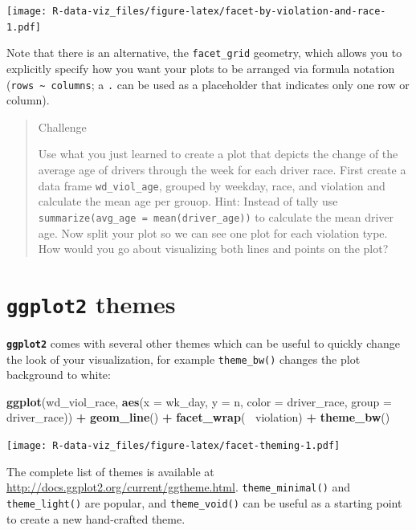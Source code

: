 \documentclass[]{book}
\newenvironment{Shaded}{\begin{snugshade}}{\end{snugshade}}
\newcommand{\KeywordTok}[1]{\textcolor[rgb]{0.13,0.29,0.53}{\textbf{#1}}}
\newcommand{\DataTypeTok}[1]{\textcolor[rgb]{0.13,0.29,0.53}{#1}}
\newcommand{\StringTok}[1]{\textcolor[rgb]{0.31,0.60,0.02}{#1}}
\newcommand{\OperatorTok}[1]{\textcolor[rgb]{0.81,0.36,0.00}{\textbf{#1}}}
\newcommand{\NormalTok}[1]{#1}
\theoremstyle{definition}
\theoremstyle{definition}
\theoremstyle{definition}
\theoremstyle{remark}
\begin{document}
\texttt{[image: R-data-viz\_files/figure-latex/facet-by-violation-and-race-1.pdf]}

Note that there is an alternative, the \texttt{facet\_grid} geometry,
which allows you to explicitly specify how you want your plots to be
arranged via formula notation
(\texttt{rows\ \textasciitilde{}\ columns}; a \texttt{.} can be used as
a placeholder that indicates only one row or column).

\begin{quote}
Challenge

Use what you just learned to create a plot that depicts the change of
the average age of drivers through the week for each driver race. First
create a data frame \texttt{wd\_viol\_age}, grouped by weekday, race,
and violation and calculate the mean age per grouop. Hint: Instead of
tally use \texttt{summarize(avg\_age\ =\ mean(driver\_age))} to
calculate the mean driver age. Now split your plot so we can see one
plot for each violation type. How would you go about visualizing both
lines and points on the plot?
\end{quote}

\section{\texorpdfstring{\textbf{\texttt{ggplot2}}
themes}{ggplot2 themes}}\label{ggplot2-themes}

\textbf{\texttt{ggplot2}} comes with several other themes which can be
useful to quickly change the look of your visualization, for example
\texttt{theme\_bw()} changes the plot background to white:

\begin{Shaded}
\begin{Highlighting}[]
\KeywordTok{ggplot}\NormalTok{(wd_viol_race, }\KeywordTok{aes}\NormalTok{(}\DataTypeTok{x =}\NormalTok{ wk_day, }\DataTypeTok{y =}\NormalTok{ n, }\DataTypeTok{color =}\NormalTok{ driver_race, }\DataTypeTok{group =}\NormalTok{ driver_race)) }\OperatorTok{+}
\StringTok{  }\KeywordTok{geom_line}\NormalTok{() }\OperatorTok{+}\StringTok{ }
\StringTok{  }\KeywordTok{facet_wrap}\NormalTok{(}\OperatorTok{~}\StringTok{ }\NormalTok{violation) }\OperatorTok{+}
\StringTok{  }\KeywordTok{theme_bw}\NormalTok{()}
\end{Highlighting}
\end{Shaded}

\texttt{[image: R-data-viz\_files/figure-latex/facet-theming-1.pdf]}

The complete list of themes is available at
\url{http://docs.ggplot2.org/current/ggtheme.html}.
\texttt{theme\_minimal()} and \texttt{theme\_light()} are popular, and
\texttt{theme\_void()} can be useful as a starting point to create a new
hand-crafted theme.
\end{document}
